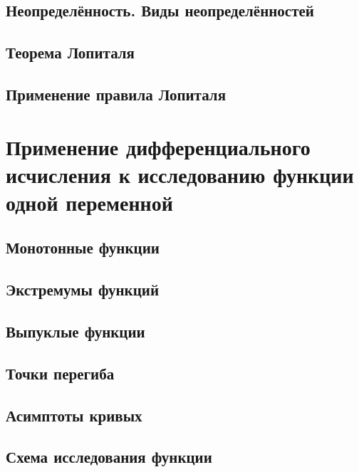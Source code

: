 \subsection{Неопределённость. Виды неопределённостей}

\subsection{Теорема Лопиталя}
%
\subsection{Применение правила Лопиталя}

\section{Применение дифференциального исчисления к исследованию функции одной переменной}
\subsection{Монотонные функции}

\subsection{Экстремумы функций} 

\subsection{Выпуклые функции}

\subsection{Точки перегиба}

\subsection{Асимптоты кривых}

\subsection{Схема исследования функции}



